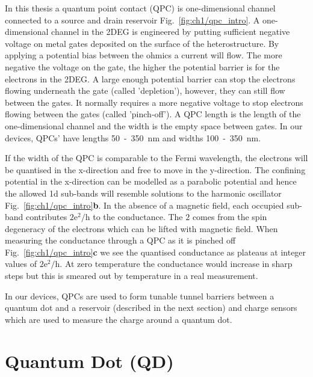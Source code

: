 In this thesis a quantum point contact (QPC) is one-dimensional channel connected to a source and drain reservoir Fig.~\ref{fig:ch1/qpc_intro}. A one-dimensional channel in the 2DEG is engineered by putting sufficient negative voltage on metal gates deposited on the surface of the heterostructure. By applying a potential bias between the ohmics a current will flow. The more negative the voltage on the gate, the higher the potential barrier is for the electrons in the 2DEG. A large enough potential barrier can stop the electrons flowing underneath the gate (called 'depletion'), however, they can still flow between the gates. It normally requires a more negative voltage to stop electrons flowing between the gates (called 'pinch-off'). A QPC length is the length of the one-dimensional channel and the width is the empty space between gates. In our devices, QPCs' have lengths 50~-~\qty{350}{nm} and widths 100~-~\qty{350}{nm}.

If the width of the QPC is comparable to the Fermi wavelength, the electrons will be quantised in the x-direction and free to move in the y-direction. The confining potential in the x-direction can be modelled as a parabolic potential and hence the allowed 1d sub-bands will resemble solutions to the harmonic oscillator Fig.~\ref{fig:ch1/qpc_intro}\textbf{b}. In the absence of a magnetic field, each occupied sub-band contributes $\mathrm{2e^2/h}$ to the conductance. The $2$ comes from the spin degeneracy of the electrons which can be lifted with magnetic field. When measuring the conductance through a QPC as it is pinched off Fig.~\ref{fig:ch1/qpc_intro}\textbf{c} we see the quantised conductance as plateaus at integer values of $\mathrm{2e^2/h}$. At zero temperature the conductance would increase in sharp steps but this is smeared out by temperature in a real measurement.

In our devices, QPCs are used to form tunable tunnel barriers between a quantum dot and a reservoir (described in the next section) and charge sensors which are used to measure the charge around a quantum dot. 




\afterpage{\clearpage}
\section{Quantum Dot (QD)}

